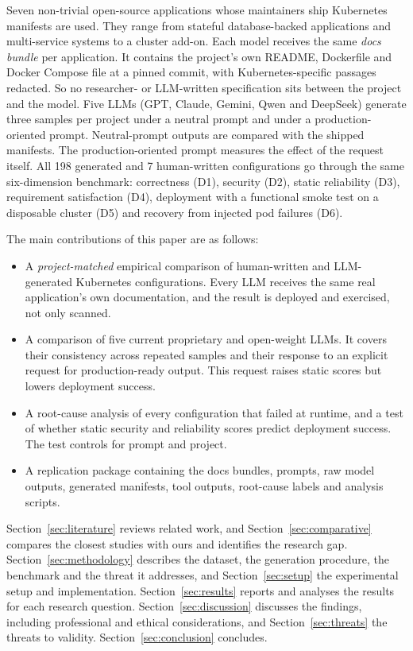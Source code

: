Seven non-trivial open-source applications whose maintainers ship Kubernetes manifests are used. They range from stateful database-backed applications and multi-service systems to a cluster add-on. Each model receives the same \emph{docs bundle} per application. It contains the project's own README, Dockerfile and Docker Compose file at a pinned commit, with Kubernetes-specific passages redacted. So no researcher- or LLM-written specification sits between the project and the model. Five LLMs (GPT, Claude, Gemini, Qwen and DeepSeek) generate three samples per project under a neutral prompt and under a production-oriented prompt. Neutral-prompt outputs are compared with the shipped manifests. The production-oriented prompt measures the effect of the request itself. All 198 generated and 7 human-written configurations go through the same six-dimension benchmark: correctness (D1), security (D2), static reliability (D3), requirement satisfaction (D4), deployment with a functional smoke test on a disposable cluster (D5) and recovery from injected pod failures (D6).

The main contributions of this paper are as follows:
\begin{itemize}
    \item A \emph{project-matched} empirical comparison of human-written and LLM-generated Kubernetes configurations. Every LLM receives the same real application's own documentation, and the result is deployed and exercised, not only scanned.
    \item A comparison of five current proprietary and open-weight LLMs. It covers their consistency across repeated samples and their response to an explicit request for production-ready output. This request raises static scores but lowers deployment success.
    \item A root-cause analysis of every configuration that failed at runtime, and a test of whether static security and reliability scores predict deployment success. The test controls for prompt and project.
    \item A replication package containing the docs bundles, prompts, raw model outputs, generated manifests, tool outputs, root-cause labels and analysis scripts.
\end{itemize}

Section~\ref{sec:literature} reviews related work, and Section~\ref{sec:comparative} compares the closest studies with ours and identifies the research gap. Section~\ref{sec:methodology} describes the dataset, the generation procedure, the benchmark and the threat it addresses, and Section~\ref{sec:setup} the experimental setup and implementation. Section~\ref{sec:results} reports and analyses the results for each research question. Section~\ref{sec:discussion} discusses the findings, including professional and ethical considerations, and Section~\ref{sec:threats} the threats to validity. Section~\ref{sec:conclusion} concludes.
